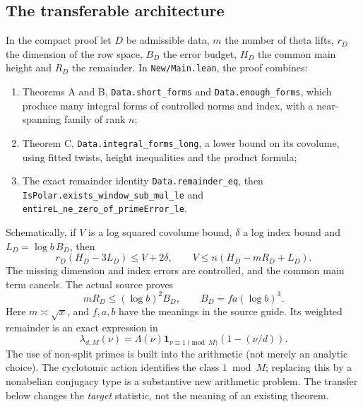 \documentclass[11pt]{article}
\theoremstyle{remark}\newtheorem{remark}[theorem]{Remark}
\newcommand{\one}{\mathbf 1}
\begin{document}
\subsection{The transferable architecture}
In the compact proof let $D$ be admissible data, $m$ the number of theta
lifts, $r_D$ the dimension of the row space, $B_D$ the error budget,
$H_D$ the common main height and $R_D$ the remainder. In
\texttt{New/Main.lean}, the proof combines:
\begin{enumerate}
\item Theorems A and B, \texttt{Data.short\_forms} and
\texttt{Data.enough\_forms}, which produce many integral forms of
controlled norms and index, with a near-spanning family of rank $n$;
\item Theorem C, \texttt{Data.integral\_forms\_long}, a lower bound on
its covolume, using fitted twists, height inequalities and the product
formula;
\item The exact remainder identity \texttt{Data.remainder\_eq}, then
\nolinkurl{IsPolar.exists_window_sub_mul_le} and
\texttt{entireL\_ne\_zero\_of\_primeError\_le}.
\end{enumerate}
Schematically, if $V$ is a log squared covolume bound, $\delta$ a log
index bound and $L_D=\log b\,B_D$, then
\[
 r_D(H_D-3L_D)\le V+2\delta,
 \qquad V\le n(H_D-mR_D+L_D).
\]
The missing dimension and index errors are controlled, and the common
main term cancels. The actual source proves
\[
 mR_D\le (\log b)^2 B_D,\qquad B_D=fa(\log b)^3.
\]
Here $m\asymp\sqrt{x}$, and $f,a,b$ have the meanings in the source
guide. Its weighted remainder is an exact expression in
\[
 \lambda_{d,M}(\nu)=\Lambda(\nu)\one_{\nu\equiv1\pmod M}
 (1-(\nu/d)).
\]
The use of non-split primes is built into the arithmetic (not merely an
analytic choice). The cyclotomic action identifies the class $1\bmod M$;
replacing this by a nonabelian conjugacy type is a substantive new
arithmetic problem. The transfer below changes the \emph{target}
statistic, not the meaning of an existing theorem.
\end{document}
